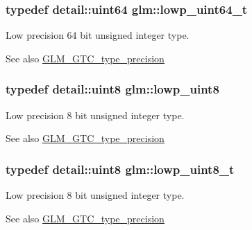 \subsubsection[{lowp\+\_\+uint64\+\_\+t}]{\setlength{\rightskip}{0pt plus 5cm}typedef detail\+::uint64 {\bf glm\+::lowp\+\_\+uint64\+\_\+t}}\label{group__gtc__type__precision_gabf3069d4f188557a87b1d7f35eb0a270}
Low precision 64 bit unsigned integer type. \begin{DoxySeeAlso}{See also}
\hyperlink{group__gtc__type__precision}{G\+L\+M\+\_\+\+G\+T\+C\+\_\+type\+\_\+precision} 
\end{DoxySeeAlso}
\hypertarget{group__gtc__type__precision_ga4d9dc08b7b248a386dfe9afd00fc6b1e}{}
\subsubsection[{lowp\+\_\+uint8}]{\setlength{\rightskip}{0pt plus 5cm}typedef {\bf detail\+::uint8} {\bf glm\+::lowp\+\_\+uint8}}\label{group__gtc__type__precision_ga4d9dc08b7b248a386dfe9afd00fc6b1e}
Low precision 8 bit unsigned integer type. \begin{DoxySeeAlso}{See also}
\hyperlink{group__gtc__type__precision}{G\+L\+M\+\_\+\+G\+T\+C\+\_\+type\+\_\+precision} 
\end{DoxySeeAlso}
\hypertarget{group__gtc__type__precision_ga0910ef24195d1b8b26e34d73148c0c45}{}
\subsubsection[{lowp\+\_\+uint8\+\_\+t}]{\setlength{\rightskip}{0pt plus 5cm}typedef {\bf detail\+::uint8} {\bf glm\+::lowp\+\_\+uint8\+\_\+t}}\label{group__gtc__type__precision_ga0910ef24195d1b8b26e34d73148c0c45}
Low precision 8 bit unsigned integer type. \begin{DoxySeeAlso}{See also}
\hyperlink{group__gtc__type__precision}{G\+L\+M\+\_\+\+G\+T\+C\+\_\+type\+\_\+precision} 
\end{DoxySeeAlso}
\hypertarget{group__gtc__type__precision_ga8454fc6a82c7bb787d0ac9663e08f63d}{}
